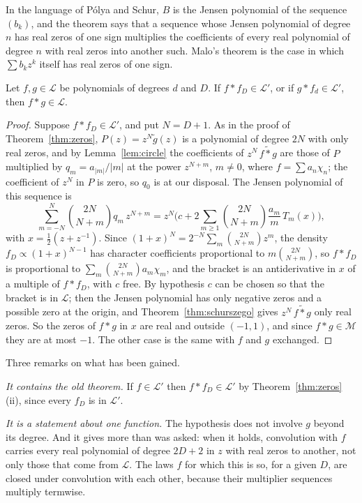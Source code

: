 In the language of P\'olya and Schur, $B$ is the Jensen polynomial of the sequence $(b_k)$, and the theorem says that a sequence whose Jensen polynomial of degree $n$ has real zeros of one sign multiplies the coefficients of every real polynomial of degree $n$ with real zeros into another such. Malo's theorem is the case in which $\sum b_kz^k$ itself has real zeros of one sign.

\begin{theorem}\label{thm:szegocriterion}
Let $f,g\in\mathcal L$ be polynomials of degrees $d$ and $D$. If $f*f_D\in\mathcal L'$, or if $g*f_d\in\mathcal L'$, then $f*g\in\mathcal L$.
\end{theorem}

\begin{proof}
Suppose $f*f_D\in\mathcal L'$, and put $N=D+1$. As in the proof of Theorem~\ref{thm:zeros}, $P(z)=z^N\tilde g(z)$ is a polynomial of degree $2N$ with only real zeros, and by Lemma~\ref{lem:circle} the coefficients of $z^N\,\widetilde{f*g}$ are those of $P$ multiplied by $q_m=a_{|m|}/|m|$ at the power $z^{N+m}$, $m\ne0$, where $f=\sum a_n\chi_n$; the coefficient of $z^N$ in $P$ is zero, so $q_0$ is at our disposal. The Jensen polynomial of this sequence is
\[
\sum_{m=-N}^{N}\binom{2N}{N+m}q_m\,z^{N+m}=z^N\Big(c+2\sum_{m\ge1}\binom{2N}{N+m}\frac{a_m}{m}\,T_m(x)\Big),
\]
with $x=\frac12(z+z^{-1})$. Since $(1+x)^N=2^{-N}\sum_m\binom{2N}{N+m}z^m$, the density $f_D\propto(1+x)^{N-1}$ has character coefficients proportional to $m\binom{2N}{N+m}$, so $f*f_D$ is proportional to $\sum_m\binom{2N}{N+m}a_m\chi_m$, and the bracket is an antiderivative in $x$ of a multiple of $f*f_D$, with $c$ free. By hypothesis $c$ can be chosen so that the bracket is in $\mathcal L$; then the Jensen polynomial has only negative zeros and a possible zero at the origin, and Theorem~\ref{thm:schurszego} gives $z^N\,\widetilde{f*g}$ only real zeros. So the zeros of $f*g$ in $x$ are real and outside $(-1,1)$, and since $f*g\in\mathcal M$ they are at most $-1$. The other case is the same with $f$ and $g$ exchanged.
\end{proof}

Three remarks on what has been gained.

\emph{It contains the old theorem.} If $f\in\mathcal L'$ then $f*f_D\in\mathcal L'$ by Theorem~\ref{thm:zeros}(ii), since every $f_D$ is in $\mathcal L'$.

\emph{It is a statement about one function.} The hypothesis does not involve $g$ beyond its degree. And it gives more than was asked: when it holds, convolution with $f$ carries every real polynomial of degree $2D+2$ in $z$ with real zeros to another, not only those that come from $\mathcal L$. The laws $f$ for which this is so, for a given $D$, are closed under convolution with each other, because their multiplier sequences multiply termwise.


